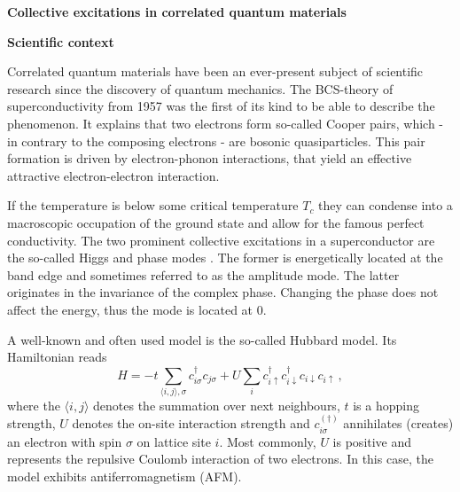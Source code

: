 \documentclass[20pt]{article}
\newcommand{\mchapter}[1]{ \begin{center} \color{tugreen!95!black} \LARGE \bf \textbf{#1} \end{center}} %
\newcommand{\msection}[1]{ { \vspace{5mm} \hspace{-6mm} \large \textbf{#1}} \vspace{2mm} } %
\begin{document}
\sf

\myhead

\vspace{2mm}
\mchapter{Collective excitations in correlated quantum materials}
\vspace{-3mm}

\msection{Scientific context}

Correlated quantum materials have been an ever-present subject of scientific research since the discovery of quantum mechanics.
The BCS-theory of superconductivity\cite{theory_of_sc} from 1957 was the first of its kind to be able to describe the phenomenon.
It explains that two electrons form so-called Cooper pairs, which - in contrary to the composing electrons - are bosonic quasiparticles.
This pair formation is driven by electron-phonon interactions, that yield an effective attractive electron-electron interaction.

If the temperature is below some critical temperature $T_c$ they can condense into a macroscopic occupation of the ground state and allow for the famous perfect conductivity.
The two prominent collective excitations in a superconductor are the so-called Higgs and phase modes \cite{higgs, bo22}.
The former is energetically located at the band edge and sometimes referred to as the amplitude mode.
The latter originates in the invariance of the complex phase. 
Changing the phase does not affect the energy, thus the mode is located at 0.

A well-known and often used model is the so-called Hubbard model. Its Hamiltonian reads
\begin{equation}
    \label{eqn:hubbard}
    H = -t \sum_{\langle i, j \rangle, \sigma} c_{i\sigma}^\dagger c_{j\sigma}  + U \sum_i c_{i\uparrow}^\dagger c_{i\downarrow}^\dagger c_{i\downarrow} c_{i\uparrow}\,,
\end{equation}
where the $\langle i, j \rangle$ denotes the summation over next neighbours, $t$ is a hopping strength, 
$U$ denotes the on-site interaction strength and $c_{i\sigma}^{(\dagger)}$ annihilates (creates) an electron with spin $\sigma$ on lattice site $i$.
Most commonly, $U$ is positive and represents the repulsive Coulomb interaction of two electrons.
In this case, the model exhibits antiferromagnetism (AFM).
\end{document}
